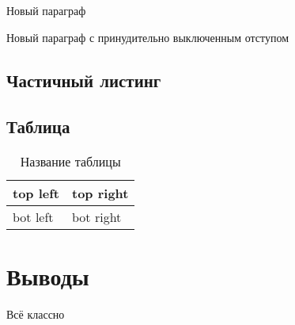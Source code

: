 Новый параграф

\noindent Новый параграф с принудительно выключенным отступом


\subsection{Частичный листинг}
\makeatletter
\def\lst@PlaceNumber{\llap{\normalfont
                \lst@numberstyle{\the\lst@lineno}\kern\lst@numbersep}}
\makeatother


\parindent=1cm

\subsection{Таблица}

\begin{table}[H]
	\begin{center}
		\begin{tabular}{|l|l|}
			\hline
			top left & top right\\ \hline
			bot left & bot right\\ \hline
		\end{tabular}
		\caption{ Название таблицы}
		\label{tabular:tab_examp}
	\end{center}
\end{table}

\section{Выводы}
 Всё классно

